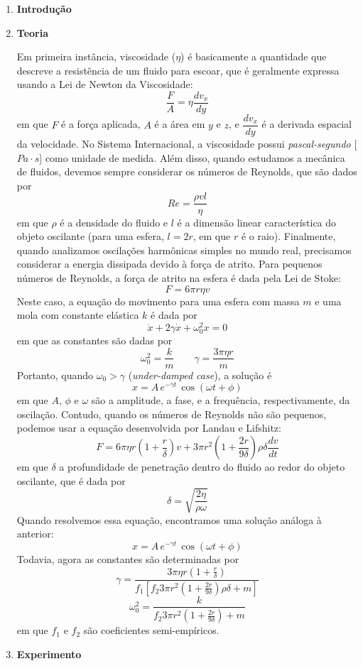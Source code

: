 \documentclass[a4paper, 12pt]{article}
\begin{document}
	\begin{multicols}{2}
	\begin{enumerate}
		\item \textbf{Introdução}
			
		\item \textbf{Teoria}
			
			
			Em primeira instância, viscosidade ($\eta$) é basicamente a quantidade que descreve a resistência de um fluido para escoar, que é geralmente expressa usando a Lei de Newton da Viscosidade:
				$$\frac{F}{A} = \eta \dfrac{dv_x}{dy}$$
				em que $F$ é a força aplicada, $A$ é a área em $y$ e $z$, e $\dfrac{dv_x}{dy}$ é a derivada espacial da velocidade. No Sistema Internacional, a viscosidade possui \textit{pascal-segundo} [$Pa \cdot s$] como unidade de medida. \linebreak
				\linebreak Além disso, quando estudamos a mecânica de fluidos, devemos sempre considerar os números de Reynolds, que são dados por
				$$Re = \frac{\rho v l}{\eta}$$
				em que $\rho$ é a densidade do fluido e $l$ é a dimensão linear característica do objeto oscilante (para uma esfera, $l = 2 r$, em que $r$ é o raio). \linebreak
				\linebreak Finalmente, quando analizamos oscilações harmônicas simples no mundo real, precisamos considerar a energia dissipada devido à força de atrito. Para pequenos números de Reynolds, a força de atrito na esfera é dada pela Lei de Stoke:
				$$F = 6 \pi r \eta v$$
				Neste caso, a equação do movimento para uma esfera com massa $m$ e uma mola com constante elástica $k$ é dada por
				$$\ddot{x} + 2 \gamma \dot{x} + \omega_0^2 x = 0$$
				em que as constantes são dadas por
					$$\omega_0^2 = \frac{k}{m} \qquad \gamma = \frac{3 \pi \eta r}{m}$$
				Portanto, quando $\omega_0 > \gamma$ (\textit{under-damped case}), a solução é
					$$x = A \, e^{- \gamma t} \, \cos (\omega t + \phi)$$
				em que $A$, $\phi$ e $\omega$ são a amplitude, a fase, e a frequência, respectivamente, da oscilação. \linebreak
				\linebreak Contudo, quando os números de Reynolds não são pequenos, podemos usar a equação desenvolvida por Landau e Lifshitz:
				$$F = 6 \pi \eta r \left(1 + \frac{r}{\delta} \right) v + 3 \pi r^2 \left( 1 + \frac{2 r}{9 \delta} \right) \rho \delta \dfrac{d v}{d t}$$
				em que $\delta$ a profundidade de penetração dentro do fluido ao redor do objeto oscilante, que é dada por
				$$\delta = \sqrt{\frac{2 \eta}{\rho \omega}}$$
				Quando resolvemos essa equação, encontramos uma solução análoga à anterior:
					$$x = A \, e^{- \gamma t} \, \cos (\omega t + \phi)$$
				Todavia, agora as constantes são determinadas por
					$$\gamma = \frac{3 \pi \eta r \left(1+ \frac{r}{\delta} \right)}{f_1 \left[ f_2 3 \pi r^2 \left(1+\frac{2 r}{9 \delta} \right) \rho \delta + m \right]}$$
					$$\omega_0^2 = \frac{k}{f_2 3 \pi r^2 \left(1 + \frac{2 r}{9 \delta} \right) + m}$$
				em que $f_1$ e $f_2$ são coeficientes semi-empíricos. \linebreak
		\item \textbf{Experimento}
			

\end{enumerate}
\end{multicols}
\end{document}
